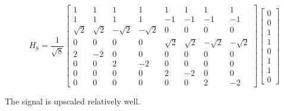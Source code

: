\documentclass{article}
\begin{document}
\begin{equation}
    H_8 =
    \frac{1}{\sqrt{8}} \begin{bmatrix}
        1 & 1 & 1 & 1 & 1 & 1 & 1 & 1 \\
        1 & 1 & 1 & 1 & -1 & -1 & -1 & -1 \\
        \sqrt{2} & \sqrt{2} & -\sqrt{2} & -\sqrt{2} & 0 & 0 & 0 & 0 \\
        0 & 0 & 0 & 0 & \sqrt{2} & \sqrt{2} & -\sqrt{2} & -\sqrt{2} \\
        2 & -2 & 0 & 0 & 0 & 0 & 0 & 0 \\
        0 & 0 & 2 & -2 & 0 & 0 & 0 & 0 \\
        0 & 0 & 0 & 0 & 2 & -2 & 0 & 0 \\
        0 & 0 & 0 & 0 & 0 & 0 & 2 & -2
    \end{bmatrix}
    \begin{bmatrix}
        0 \\
        0 \\
        1 \\
        1 \\
        0 \\
        1 \\
        1 \\
        0
    \end{bmatrix}
\end{equation}
\begin{center}
\end{center}
The signal is upscaled relatively well.
\end{document}
